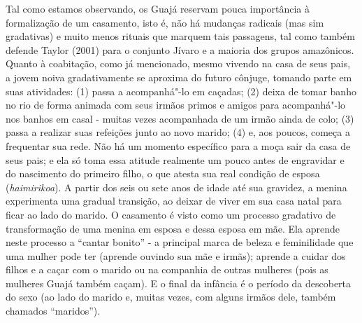 Tal como estamos observando, os Guajá reservam pouca importância à
formalização de um casamento, isto é, não há mudanças radicais (mas sim
gradativas) e muito menos rituais que marquem tais passagens, tal como
também defende Taylor (2001) para o conjunto Jívaro e a maioria dos
grupos amazônicos. Quanto à coabitação, como já mencionado, mesmo
vivendo na casa de seus pais, a jovem noiva gradativamente se aproxima
do futuro cônjuge, tomando parte em suas atividades: (1) passa a
acompanhá"-lo em caçadas; (2) deixa de tomar banho no rio de forma
animada com seus irmãos primos e amigos para acompanhá"-lo nos banhos em
casal - muitas vezes acompanhada de um irmão ainda de colo; (3) passa a
realizar suas refeições junto ao novo marido; (4) e, aos poucos, começa
a frequentar sua rede. Não há um momento específico para a moça sair da
casa de seus pais; e ela só toma essa atitude realmente um pouco antes
de engravidar e do nascimento do primeiro filho, o que atesta sua real
condição de esposa (\emph{haimirikoa}). A partir dos seis ou sete anos
de idade até sua gravidez, a menina experimenta uma gradual transição,
ao deixar de viver em sua casa natal para ficar ao lado do marido. O
casamento é visto como um processo gradativo de transformação de uma
menina em esposa e dessa esposa em mãe. Ela aprende neste processo a
``cantar bonito'' - a principal marca de beleza e feminilidade que uma
mulher pode ter (aprende ouvindo sua mãe e irmãs); aprende a cuidar dos
filhos e a caçar com o marido ou na companhia de outras mulheres (pois
as mulheres Guajá também caçam). E o final da infância é o período da
descoberta do sexo (ao lado do marido e, muitas vezes, com alguns irmãos
dele, também chamados ``maridos'').

